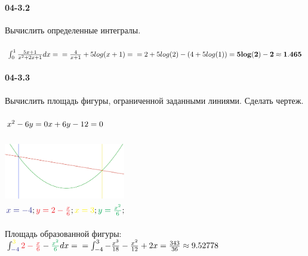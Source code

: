 \documentclass[12pt]{article}
\begin{document}
	\paragraph{04-3.2} Вычислить определенные интегралы.
	\\\\
	\ensuremath{
		\int_{0}^{1} \frac{5 x + 1}{x ^2 + 2 x + 1} dx = \\
		= \frac{4}{x + 1} + 5 log( x + 1 ) = \\
		= 2 + 5 log(2) - ( 4 + 5 log (1) )  \\
		= {\bf 5 log(2) - 2 \approx 1.465 }
	}
	
	\paragraph{04-3.3} Вычислить площадь фигуры, ограниченной заданными линиями. Сделать чертеж.
	\\\\
	\ensuremath{
		x ^2 - 6 y = 0 \\
		x + 6 y - 12 = 0
	}
	\\
	\\
	\includegraphics[width=200px,height=100px]{RG-Uni-Calculus-Reference_Work_3-04-1-3.eps}
	\\
	\ensuremath{
		\textcolor{Blue}{ x = -4 };
		\textcolor{Red}{ y = 2 - \frac{x}{6} }; \\
		\textcolor{Yellow}{x = 3 };
		\textcolor{Green}{ y = \frac{x ^2}{6} };
	}
	\\\\
	Площадь образованной фигуры: \\
	\ensuremath{
		\int_{\textcolor{Blue}{-4}}^{\textcolor{Yellow}{3}} \textcolor{Red}{ 2 - \frac{x}{6} } - \textcolor{Green}{ \frac{x ^2}{6} } dx =\\
		= \int_{-4}^{3} - \frac{x ^3}{18} - \frac{x ^2}{12} + 2 x = \frac{343}{36} \approx 9.52778 \\
	}
\end{document}
